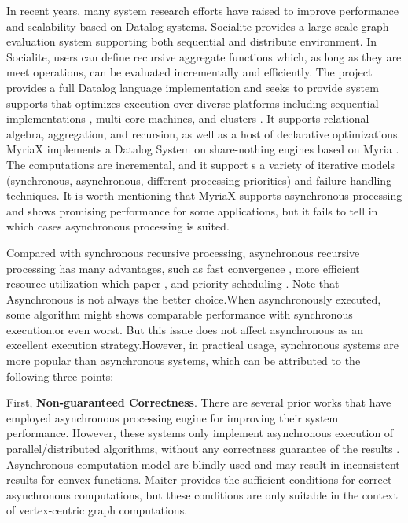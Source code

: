 In recent years, many system research efforts have raised to improve performance  and scalability based on Datalog systems. Socialite \cite{Lam:2013:SDE:2510649.2511289,Seo:2013:DSD:2556549.2556572} provides a large scale graph evaluation system supporting both sequential and distribute environment. In Socialite, users can define recursive aggregate functions which, as long as they are meet operations, can be evaluated incrementally and efficiently. The \cite{7113340} project provides a full Datalog language implementation and seeks to provide  system supports that optimizes execution over diverse platforms including sequential implementations \cite{Shkapsky:2016:BDA:2882903.2915229}, multi-core machines, and clusters \cite{Shkapsky:2016:BDA:2882903.2915229}. It supports relational algebra, aggregation, and recursion, as well as a host of declarative optimizations. MyriaX \cite{Halperin:2014:DMB:2588555.2594530} implements a Datalog System on share-nothing engines based on Myria \cite{Halperin:2014:DMB:2588555.2594530}. The computations are incremental, and it support s a variety of iterative models (synchronous, asynchronous, different processing priorities) and failure-handling techniques. It is worth mentioning that MyriaX supports asynchronous processing and shows promising performance for some applications, but it fails to tell in which cases asynchronous processing is suited.

Compared with synchronous recursive processing, asynchronous recursive processing has many advantages, such as fast convergence \cite{maiter}, more efficient resource utilization \cite{}{\color{red}which paper} , and priority scheduling \cite{Zhang:2011:PDF:2038916.2038929}. Note that Asynchronous is not always the better choice.When asynchronously executed, some algorithm might shows comparable performance with synchronous execution.or even worst. But this issue does not affect asynchronous as an excellent execution strategy.However, in practical usage, synchronous systems are more popular than asynchronous systems, which can be attributed to the following three points:


First, \textbf{Non-guaranteed Correctness}. There are several prior works that have employed asynchronous processing engine for improving their system performance. However, these systems only implement asynchronous execution of parallel/distributed algorithms, without any correctness guarantee of the results \cite{GRAPHLAB}. Asynchronous computation model are blindly used and may result in inconsistent results for convex functions. Maiter \cite{maiter} provides the sufficient conditions for correct asynchronous computations, but these conditions are only suitable in the context of vertex-centric graph computations.

